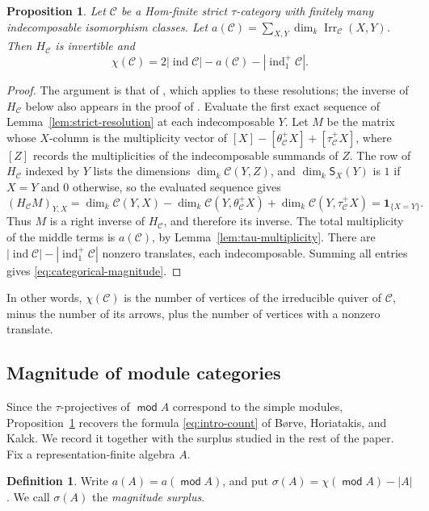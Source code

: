 \documentclass[a4paper,reqno,10pt]{amsart}
\newtheorem{proposition}[theorem]{Proposition}
\theoremstyle{definition}
\newtheorem{definition}[theorem]{Definition}
\numberwithin{equation}{section}
\DeclareMathOperator{\moduleCategory}{\mathsf{mod}}
\renewcommand{\mod}{\moduleCategory}
\DeclareMathOperator{\ind}{ind}
\DeclareMathOperator{\Irr}{Irr}
\newcommand{\cC}{\mathcal C}
\newcommand{\indicator}{\mathbf 1}
\begin{document}
\begin{proposition}\label{thm:categorical-magnitude}
Let \(\cC\) be a Hom-finite strict \(\tau\)-category with finitely
many indecomposable isomorphism classes.
Let \(a(\cC)=\sum_{X,Y}\dim_k\Irr_{\cC}(X,Y)\).
Then \(H_{\cC}\) is invertible and
\begin{equation}\label{eq:categorical-magnitude}
 \chi(\cC)=2|\ind\cC|-a(\cC)-|\ind_1^+\cC|.
\end{equation}
\end{proposition}
\begin{proof}
The argument is that of \cite[Lemma~1.9]{BHK}, which applies
\cite[Theorem~1.1]{CKL} to these resolutions; the inverse of \(H_{\cC}\)
below also appears in the proof of \cite[Theorem~4.3]{IyamaIV}.
Evaluate the first exact sequence of Lemma~\ref{lem:strict-resolution}
at each indecomposable \(Y\). Let \(M\) be the matrix whose \(X\)-column is
the multiplicity vector of \([X]-[\theta_{\cC}^+X]+[\tau_{\cC}^+X]\), where
\([Z]\) records the multiplicities of the indecomposable summands of \(Z\).
The row of \(H_{\cC}\) indexed by \(Y\) lists the dimensions
\(\dim_k\cC(Y,Z)\), and \(\dim_k\mathsf S_X(Y)\) is \(1\) if \(X=Y\) and
\(0\) otherwise, so the evaluated sequence gives
\[
 (H_{\cC}M)_{Y,X}=\dim_k\cC(Y,X)-\dim_k\cC(Y,\theta_{\cC}^+X)
 +\dim_k\cC(Y,\tau_{\cC}^+X)=\indicator_{\{X=Y\}}.
\]
Thus \(M\) is a right inverse of \(H_{\cC}\), and therefore its inverse.
The total multiplicity of the middle terms is \(a(\cC)\), by
Lemma~\ref{lem:tau-multiplicity}. There are
\(|\ind\cC|-|\ind_1^+\cC|\) nonzero translates, each
indecomposable. Summing all entries gives \eqref{eq:categorical-magnitude}.
\end{proof}
In other words, \(\chi(\cC)\) is the number of vertices of the irreducible
quiver of \(\cC\), minus the number of its arrows, plus the number of
vertices with a nonzero translate.

\subsection{Magnitude of module categories}
Since the \(\tau\)-projectives of \(\mod A\) correspond to the simple
modules, Proposition~\ref{thm:categorical-magnitude} recovers the formula
\eqref{eq:intro-count} of B{\o}rve, Horiatakis, and Kalck. We record it together with the
surplus studied in the rest of the paper. Fix a representation-finite
algebra \(A\).

\begin{definition}\label{def:surplus}
Write \(a(A)=a(\mod A)\), and put \(\sigma(A)=\chi(\mod A)-|A|\). We
call \(\sigma(A)\) the \emph{magnitude surplus}.
\end{definition}
\end{document}
